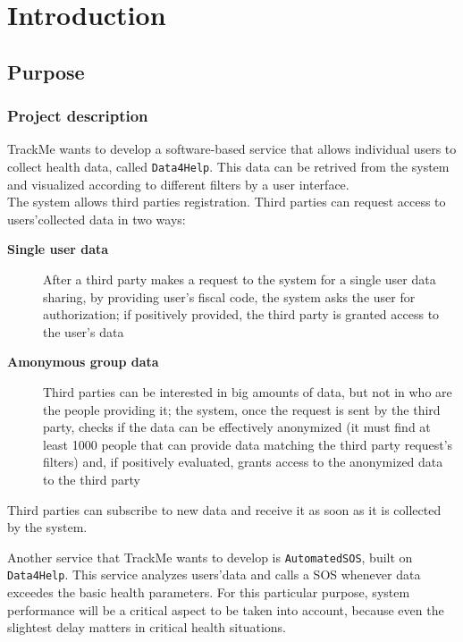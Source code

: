 \section{Introduction}
\label{sec:intro}

  \subsection{Purpose}

      \subsubsection{Project description}

        TrackMe wants to develop a software-based service that allows individual users to collect health data, called \texttt{Data4Help}. This data can be retrived from the system and visualized according to different filters by a user interface. \\
        The system allows third parties registration. Third parties can request access to users'collected data in two ways:

        \begin{description}
          \item [\textbf{Single user data}] After a third party makes a request to the system for a single user data sharing, by providing  user's fiscal code, the system asks the user for authorization; if positively provided, the third party is granted access to the user's data
          \item [\textbf{Amonymous group data}] Third parties can be interested in big amounts of data, but not in who are the people providing it; the system, once the request is sent by the third party, checks if the data can be effectively anonymized (it must find at least 1000 people that can provide data matching the third party request's filters) and, if positively evaluated, grants access to the anonymized data to the third party
        \end{description}

        Third parties can subscribe to new data and receive it as soon as it is collected by the system.

        Another service that TrackMe wants to develop is \texttt{AutomatedSOS}, built on \texttt{Data4Help}. This service analyzes users'data and calls a SOS whenever data exceedes the basic health parameters. For this particular purpose, system performance will be a critical aspect to be taken into account, because even the slightest delay matters in critical health situations.

